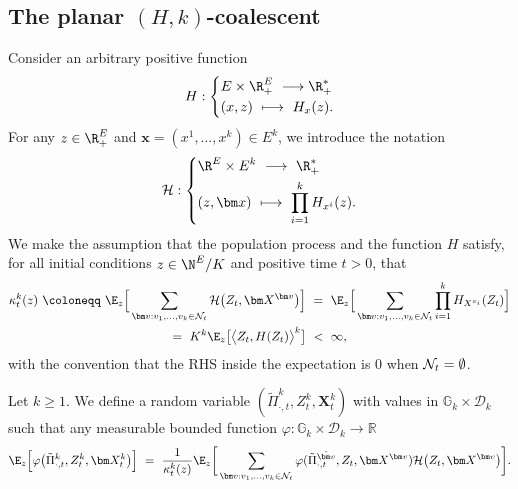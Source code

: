 \begin{refsegment}
\subsection{The planar $(H,k)$-coalescent}
Consider an arbitrary positive function
\begin{equation*}
  H: \left\{\begin{aligned}
   & E\times \R^E_+\ \longrightarrow \R^*_+\\
  &(x,z)\ \longmapsto\ H_x(z).
  \end{aligned}\right.
\end{equation*}
For any $z\in\R_+^E$ and $\bm x= (x^1,\ldots, x^k)\in E^k$, we introduce the notation
\begin{equation}\label{Ch4:eq:cal_H^k}
\mathcal{H}:
\left\{\begin{aligned}
&\R^E\times E^k\  \longrightarrow\ \R_+^*\\
&(z,\bm x)\ \longmapsto\ \prod_{i=1}^k H_{x^i}(z).
  \end{aligned}\right.
\end{equation}
We make the assumption that the population process and the function $H$ satisfy, for all initial conditions $z\in\N^E/K$ and positive time $t>0$, that 
\begin{multline}\label{Ch4:eq:normalizing_constant_manytofew}
 \kappa^{k}_{t}(z)\ \coloneqq\ \E_{z}\Big[ \sum_{\bm v:v_1, \ldots, v_k\in \mathcal{N}_t}\mathcal{H}\big(Z_t,\bm X^{\bm v}\big)\Big]\ 
=\ \E_{z}\Big[ \sum_{\bm v:v_1, \ldots, v_k\in \mathcal{N}_t}\prod_{i=1}^k H_{X^{v_i}}(Z_t)\Big]\\
 =\  K^k \E_{z}\big[ \big\langle Z_t, H(Z_t)\big\rangle^k \big]\ <\ \infty,
\end{multline}
with the convention that the RHS inside the expectation is $0$ when ${\cal N}_t=\emptyset$. 

\begin{defn}[$(H,k)-$coalescent]\label{def:Hk-coal}
Let $k\geq 1$.
We define a random variable $(\tilde \Pi^k_{\cdot,t}, Z^k_t, \bm X^k_t)$  with values in $\mathbb{G}_{k}\times \mathscr{D}_{k}$ such that any measurable bounded function $\varphi: \mathbb{G}_{k}\times \mathscr{D}_{k} \to \mathbb{R}$
\begin{equation*}
  \E_{z}\Big[\varphi\big(\tilde{\Pi}^k_{\cdot,t}, Z^k_t, \bm X^k_t\big)\Big]\ =\ 
    \frac{1}{\kappa^k_{t}(z)}  \E_{z}\bigg[
\sum_{\bm v:v_1 , \ldots ,v_k\in\mathcal{N}_t }\varphi(\tilde\Pi^{\tilde{\bm v}}_{\cdot,t} , Z_t, \bm X^{\bm v})\mathcal{H}\big(Z_t,\bm X^{\bm v}\big)\bigg].
\end{equation*}
\end{defn}



\end{refsegment}
